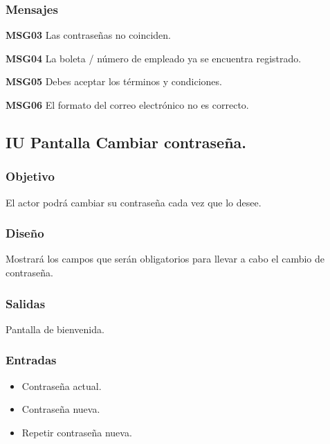 \subsubsection{Mensajes}
\begin{Citemize}
	\item {\bf MSG03} Las contraseñas no coinciden.
	\item {\bf MSG04} La boleta / número de empleado ya se encuentra registrado.
	\item {\bf MSG05} Debes aceptar los términos y condiciones.
	\item {\bf MSG06} El formato del correo electrónico no es correcto.
\end{Citemize}


\subsection{IU Pantalla Cambiar contraseña.}

\subsubsection{Objetivo}
	El actor podrá cambiar su contraseña cada vez que lo desee.

\subsubsection{Diseño}
	Mostrará los campos que serán obligatorios para llevar a cabo el cambio de contraseña.


\subsubsection{Salidas}

	Pantalla de bienvenida.

\subsubsection{Entradas}

\begin{itemize}
	\item Contraseña actual.
	\item Contraseña nueva.
	\item  Repetir contraseña nueva.
\end{itemize}

